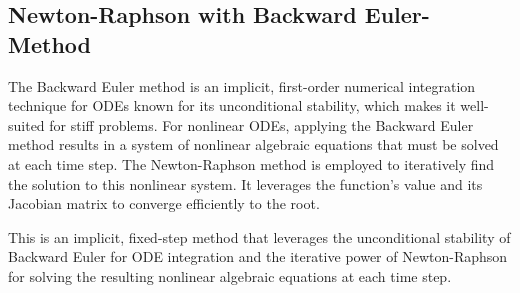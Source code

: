 \documentclass[conference]{IEEEtran}
\begin{document}
\subsection{Newton-Raphson with Backward Euler-Method}

The Backward Euler method is an implicit, first-order numerical integration technique for ODEs known for its unconditional stability, which makes it well-suited for stiff problems. For nonlinear ODEs, applying the Backward Euler method results in a system of nonlinear algebraic equations that must be solved at each time step. The Newton-Raphson method is employed to iteratively find the solution to this nonlinear system. It leverages the function's value and its Jacobian matrix to converge efficiently to the root.

This is an implicit, fixed-step method that leverages the unconditional stability of Backward Euler for ODE integration and the iterative power of Newton-Raphson for solving the resulting nonlinear algebraic equations at each time step.
\end{document}
